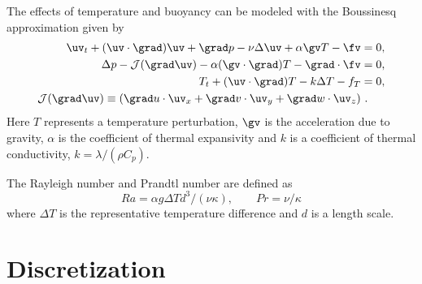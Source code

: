 \documentclass[10pt]{article}
\begin{document}
The effects of temperature and buoyancy can be modeled with the Boussinesq approximation
given by
\begin{align*}
  \uv_t + (\uv\cdot\grad)\uv + \grad p -\nu \Delta \uv +\alpha \gv T  -\fv &=0 ,\\
  \Delta p - \Jc(\grad\uv) -\alpha (\gv\cdot\grad) T - \grad\cdot\fv &=0,  \\
  T_t + (\uv\cdot\grad) T - k \Delta T - f_T &=0 , \\
  \Jc(\grad\uv) \equiv (\grad u\cdot\uv_x + \grad v\cdot\uv_y + \grad w\cdot \uv_z) &~.
\end{align*}
Here $T$ represents a temperature perturbation, $\gv$ is the acceleration due to gravity,
$\alpha$ is the coefficient of thermal expansivity and $k$ is a coefficient of
thermal conductivity, $k=\lambda/(\rho C_p)$. 


The Rayleigh number and Prandtl number are defined
as
\[
   Ra = \alpha g \Delta T d^3 /(\nu\kappa), \qquad Pr = \nu/\kappa 
\]
where $\Delta T$ is the representative temperature difference and $d$ is a length scale. 



% 


\section{ Discretization}
\end{document}
